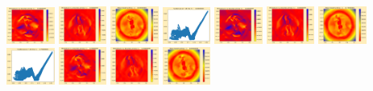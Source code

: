 \documentclass[11pt]{article}
\begin{document}
\includegraphics[width=0.11875\textwidth]{frame0065fig2.png}
\includegraphics[width=0.11875\textwidth]{frame0065fig3.png}
\vskip 10pt 
\includegraphics[width=0.11875\textwidth]{frame0066fig0.png}
\includegraphics[width=0.11875\textwidth]{frame0066fig1.png}
\includegraphics[width=0.11875\textwidth]{frame0066fig2.png}
\includegraphics[width=0.11875\textwidth]{frame0066fig3.png}
\includegraphics[width=0.11875\textwidth]{frame0067fig0.png}
\includegraphics[width=0.11875\textwidth]{frame0067fig1.png}
\includegraphics[width=0.11875\textwidth]{frame0067fig2.png}
\includegraphics[width=0.11875\textwidth]{frame0067fig3.png}
\vskip 10pt 
\includegraphics[width=0.11875\textwidth]{frame0068fig0.png}
\end{document}
